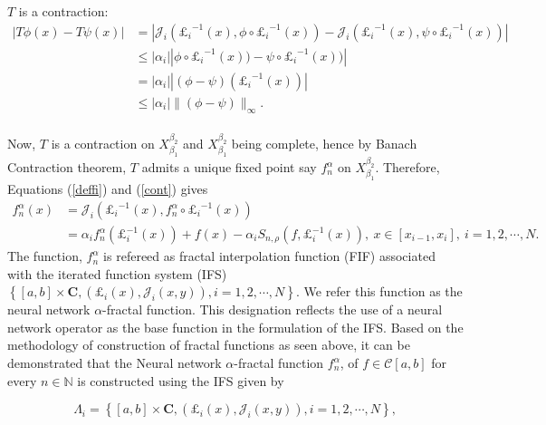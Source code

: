 \documentclass{article}[12pt, a4]
\begin{document}
	$T$ is a contraction:
	\begin{align*}
		|T\phi(x)-T\psi(x)|&=|\mathcal{J}_i({\pounds_i}^{-1}(x),\phi\circ {\pounds_i}^{-1}(x))-\mathcal{J}_i({\pounds_i}^{-1}(x),\psi\circ {\pounds_i}^{-1}(x))|\\
		&\leq |\alpha_{i}||\phi\circ {\pounds_i}^{-1}(x))-\psi\circ {\pounds_i}^{-1}(x))|\\
		&= |\alpha_{i}||(\phi - \psi) ({\pounds_i}^{-1}(x))|\\
		&\leq |\alpha_{i}| \|(\phi - \psi)\|_{\infty}.
	\end{align*}\\
	Now, $T $ is a contraction on $X_{\beta_1}^{\beta_2}$ and $X_{\beta_1}^{\beta_2}$ being complete, hence by Banach Contraction theorem, $T$ admits a unique fixed point say $f_{n}^{\alpha}$ on $X_{\beta_1}^{\beta_2}$. Therefore, Equations (\ref{deffi}) and  (\ref{cont}) gives
	\begin{align}\label{fif}
		f_{n}^{\alpha}(x)&=\mathcal{J}_i({\pounds_i}^{-1}(x),f_{n}^{\alpha}\circ {\pounds_i}^{-1}(x)) \nonumber\\
		&=\alpha_{i}f_{n}^{\alpha}(\pounds_{i}^{-1}(x))+f(x)-\alpha_{i}S_{n,\rho}(f, \pounds_{i}^{-1}(x)),~ x \in [x_{i-1}, x_{i}],~i =1,2,\cdots,N.
	\end{align}
	The function, $f_{n}^{\alpha}$ is refereed as fractal interpolation function (FIF) associated with the iterated function system (IFS) $\left\{[a,b] \times \mathbf{C},\left(\pounds_{i}(x), \mathcal{J}_{i}(x, y)\right), i =1,2,\cdots,N\right\}$. We refer this function as the neural network $\alpha$-fractal function. This designation reflects the use of a neural network operator as the base function in the formulation of the IFS. Based on the methodology of construction of fractal functions as seen above, it can be demonstrated  that the Neural network $\alpha$-fractal function $f_{n}^{\alpha}$, of $f \in \mathcal{C}[a,b]$ for every $n \in \mathbb{N}$ is constructed using the IFS given by
	
	
	\begin{equation*}
		\Lambda_{i}=\left\{[a,b] \times \mathbf{C},\left(\pounds_{i}(x), \mathcal{J}_{i}(x, y)\right), i =1,2,\cdots,N\right\}, %
	\end{equation*}
	
\end{document}
